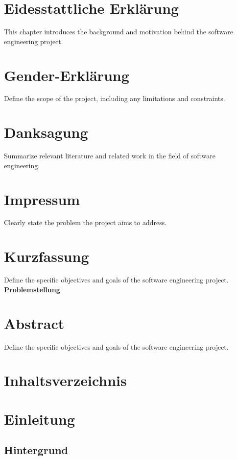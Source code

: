 \documentclass{report}
\begin{document}
\maketitle

\tableofcontents

\chapter{Eidesstattliche Erklärung}
This chapter introduces the background and motivation behind the software engineering project.

\chapter{Gender-Erklärung}
Define the scope of the project, including any limitations and constraints.

\chapter{Danksagung}
Summarize relevant literature and related work in the field of software engineering.

\chapter{Impressum}
Clearly state the problem the project aims to address.

\chapter{Kurzfassung}
Define the specific objectives and goals of the software engineering project.
\textbf{Problemstellung} 

\chapter{Abstract}
Define the specific objectives and goals of the software engineering project.

\chapter{Inhaltsverzeichnis}

\chapter{Einleitung}
\section{Hintergrund}
\end{document}
